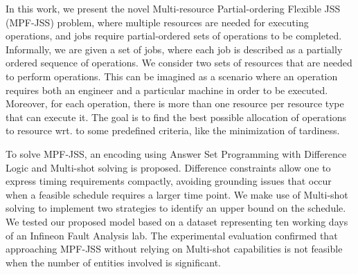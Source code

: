 \documentclass[submission,copyright,creativecommons]{eptcs}
\newcommand{\jss}{MPF-JSS\xspace}
\begin{document}
In this work, we present the novel Multi-resource Partial-ordering Flexible JSS (MPF-JSS) problem, where multiple resources are needed for executing operations, and jobs require partial-ordered sets of operations to be completed. Informally, we are given a set of jobs, where each job is described as a partially ordered sequence of operations. We consider two sets of resources that are needed to perform operations. This can be imagined as a scenario where an operation requires both an engineer and a particular machine in order to be executed. Moreover, for each operation, there is more than one resource per resource type that can execute it. 
The goal is to find the best possible allocation of operations to resource wrt. to some predefined criteria, like the minimization of tardiness. 

To solve MPF-JSS, an encoding using Answer Set Programming with Difference Logic \cite{gebser2016theory} and Multi-shot solving \cite{gebser2019multi} is proposed. Difference constraints allow one to express timing requirements compactly, avoiding grounding issues that occur when a feasible schedule requires a larger time point. We make use of Multi-shot solving \cite{gebser2019multi} to implement two strategies to identify an upper bound on the schedule.
We tested our proposed model based on a dataset representing ten working days of an Infineon Fault Analysis lab. The experimental evaluation confirmed that approaching \jss without relying on Multi-shot capabilities is not feasible when the number of entities involved is significant.  %
\end{document}
